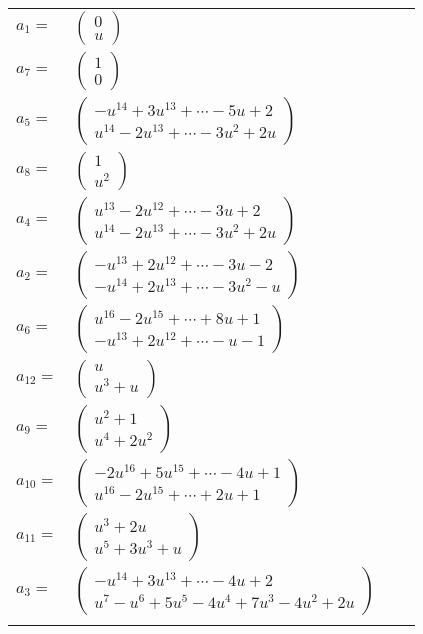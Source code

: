 \documentclass[1p]{elsarticle_modified}
\theoremstyle{definition}
\begin{document}
\begin{tabular}{m{7pt} m{180pt} m{7pt} m{180pt} }
\flushright $a_{1}=$&$\begin{pmatrix}0\\u\end{pmatrix}$ \\
\flushright $a_{7}=$&$\begin{pmatrix}1\\0\end{pmatrix}$ \\
\flushright $a_{5}=$&$\begin{pmatrix}- u^{14}+3 u^{13}+\cdots-5 u+2\\u^{14}-2 u^{13}+\cdots-3 u^2+2 u\end{pmatrix}$ \\
\flushright $a_{8}=$&$\begin{pmatrix}1\\u^2\end{pmatrix}$ \\
\flushright $a_{4}=$&$\begin{pmatrix}u^{13}-2 u^{12}+\cdots-3 u+2\\u^{14}-2 u^{13}+\cdots-3 u^2+2 u\end{pmatrix}$ \\
\flushright $a_{2}=$&$\begin{pmatrix}- u^{13}+2 u^{12}+\cdots-3 u-2\\- u^{14}+2 u^{13}+\cdots-3 u^2- u\end{pmatrix}$ \\
\flushright $a_{6}=$&$\begin{pmatrix}u^{16}-2 u^{15}+\cdots+8 u+1\\- u^{13}+2 u^{12}+\cdots- u-1\end{pmatrix}$ \\
\flushright $a_{12}=$&$\begin{pmatrix}u\\u^3+u\end{pmatrix}$ \\
\flushright $a_{9}=$&$\begin{pmatrix}u^2+1\\u^4+2 u^2\end{pmatrix}$ \\
\flushright $a_{10}=$&$\begin{pmatrix}-2 u^{16}+5 u^{15}+\cdots-4 u+1\\u^{16}-2 u^{15}+\cdots+2 u+1\end{pmatrix}$ \\
\flushright $a_{11}=$&$\begin{pmatrix}u^3+2 u\\u^5+3 u^3+u\end{pmatrix}$ \\
\flushright $a_{3}=$&$\begin{pmatrix}- u^{14}+3 u^{13}+\cdots-4 u+2\\u^7- u^6+5 u^5-4 u^4+7 u^3-4 u^2+2 u\end{pmatrix}$\\&\end{tabular}
\end{document}
